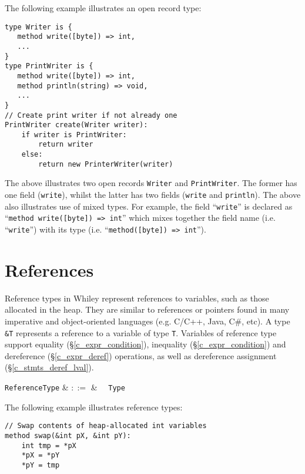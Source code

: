 \noindent The following example illustrates an open record type: 
\begin{lstlisting}
type Writer is { 
   method write([byte]) => int,
   ...
}
type PrintWriter is { 
   method write([byte]) => int,
   method println(string) => void,
   ...
}
// Create print writer if not already one
PrintWriter create(Writer writer):
    if writer is PrintWriter:
        return writer
    else:
        return new PrinterWriter(writer)
\end{lstlisting}
The above illustrates two open records \lstinline{Writer} and \lstinline{PrintWriter}.  The former has one field (\lstinline{write}), whilst the latter has two fields (\lstinline{write} and \lstinline{println}).  The above also illustrates use of mixed types.  For example, the field ``\lstinline{write}'' is declared as ``\lstinline{method write([byte]) => int}'' which mixes together the field name (i.e. ``\lstinline{write}'') with its type (i.e. ``\lstinline{method([byte]) => int}'').


\section{References}

Reference types in Whiley represent references to variables, such as those allocated in the heap.  They are similar to references or pointers found in many imperative and object-oriented languages (e.g. C/C++, Java, C\#, etc).  A type \lstinline{&T} represents a reference to a variable of type \lstinline{T}.  Variables of reference type support equality (\S\ref{c_expr_condition}), inequality (\S\ref{c_expr_condition}) and dereference (\S\ref{c_expr_deref}) operations, as well as dereference assignment (\S\ref{c_stmts_deref_lval}).

\begin{syntax}
  \verb+ReferenceType+ & $::=$ & \token{\&}\ \ \verb+Type+\\
\end{syntax}

\noindent The following example illustrates reference types:
\begin{lstlisting}
// Swap contents of heap-allocated int variables
method swap(&int pX, &int pY):
    int tmp = *pX
    *pX = *pY
    *pY = tmp
\end{lstlisting} 

